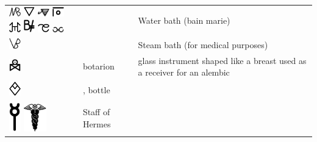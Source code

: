 \documentclass[british,final,landscape]{scrartcl}
\begin{document}
\begin{refsection}
\begin{supertabular}{p{0.3\textwidth}p{0.34\textwidth}p{0.34\textwidth}}
   \includegraphics[width=5mm]{Tools/BalneumMariae} \includegraphics[width=5mm]{Tools/BalneumMariae2} \includegraphics[width=5mm]{Tools/BalneumMariae3} \includegraphics[width=5mm]{Tools/BalneumMariae4} \includegraphics[width=5mm]{Tools/BalneumMariae5} \includegraphics[width=5mm]{Tools/BalneumMariae6} \includegraphics[width=5mm]{Tools/BalneumMariae7} \includegraphics[width=5mm]{Tools/BalneumMariae8} &  & Water bath (bain marie) \\
   \includegraphics[width=5mm]{Tools/BalneumVaporis} &  & Steam bath (for medical purposes)\\
   \includegraphics[width=5mm]{Tools/Botarion} & botarion & glass instrument shaped like a breast used as a receiver for an alembic \\
   \includegraphics[width=5mm]{Tools/Bottle} & , bottle & \\
   \includegraphics[width=5mm]{Tools/Caduceus} \includegraphics[width=10mm]{Tools/Caduceus2} & Staff of Hermes & \\

\end{supertabular}
\end{refsection}
\end{document}
